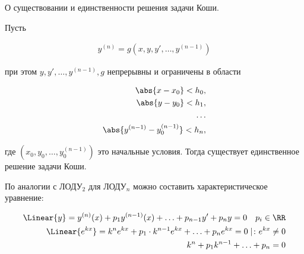 
\begin{remark}
  О существовании и единственности решения задачи Коши.

  Пусть 

  \begin{align*}
    y^{(n)} = g(x, y, y', \dotsc, y^{(n - 1)})
  \end{align*}

  при этом \(y, y', \dots, y^{(n - 1)}, g\) непрерывны и ограничены в области

  \begin{align*}
    \abs{x - x_{0}} < h_{0}, \\
    \abs{y - y_{0}} < h_{1}, \\
    \dots \\
    \abs{y^{(n - 1)} - y^{(n - 1)}_{0}} < h_{n},
  \end{align*}

  где \((x_{0}, y_{0}, \dots, y^{(n - 1)}_{0})\) это начальные условия.
  Тогда существует единственное решение задачи Коши.

\end{remark}

По аналогии с ЛОДУ\(_2\) для ЛОДУ\(_n\) можно составить характеристическое
уравнение:

\begin{align*}
  \Linear{y}
  = y^{(n)}(x) + p_{1} y^{(n - 1)} (x) + \dotsc + p_{n - 1} y' + p_{n} y = 0
  \hspace{10pt} p_{i} \in \RR
  \\
  \Linear{e^{k x}}
  = k^{n} e^{k x} + p_{1} \cdot k^{n - 1} e^{k x} + \dotsc + p_{n} e^{k x} = 0
  \mid \colon e^{k x} \neq 0 
  \\
  k^{n} + p_{1} k^{n - 1}+ \dotsc + p_{n} = 0
\end{align*}

